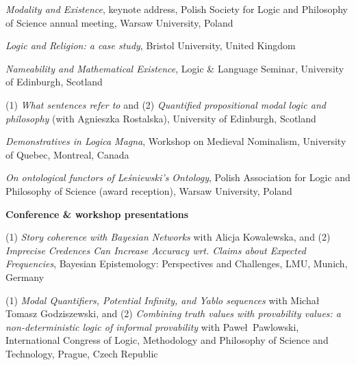 \documentclass[10pt, a4paper]{article}
\newcommand{\years}[1]{\marginnote{\normalsize #1}}
\begin{document}
 \emph{Modality and Existence}, keynote address, Polish Society for Logic and Philosophy of Science annual \newline meeting,  Warsaw University, Poland


\vspace{0.5mm}



 \emph{Logic and Religion: a case study},    Bristol University, United Kingdom



\vspace{0.5mm}


\emph{Nameability and Mathematical Existence},  Logic \& Language Seminar,   University of Edinburgh, Scotland


\vspace{0.5mm}

\years{2008} 
  (1) \emph{What   sentences   refer   to} and (2) 
\emph{Quantified propositional modal  logic and philosophy} (with Agnieszka Rostalska),       University   of    Edinburgh,
Scotland


\vspace{0.5mm}


\years{2006} \emph{Demonstratives in Logica Magna}, Workshop on Medieval Nominalism,  University of Quebec, Montreal, Canada


\vspace{0.5mm}


\pagebreak 
 \years{2005}\emph{On ontological functors of Le{\'s}niewski's Ontology},  Polish Association for Logic and Philosophy of
Science (award reception),  Warsaw University, Poland

\vspace{1.5mm}



 {\sc \textbf{Conference \& workshop presentations}}\normalsize 



\noindent

\vspace{1.5mm}


\years{2020}  (1) \emph{Story coherence with Bayesian Networks} with Alicja Kowalewska, and (2) \emph{ Imprecise Credences Can Increase Accuracy wrt. Claims about Expected Frequencies}, Bayesian Epistemology: Perspectives and Challenges, LMU, Munich, Germany





\years{2019} (1) \emph{Modal Quantifiers, Potential Infinity, and Yablo sequences} with Micha\l\, Tomasz Godziszewski, and (2) \emph{Combining truth values with provability values: a non-deterministic logic of informal provability} with Pawe\l\, Pawlowski, International Congress of Logic, Methodology and Philosophy of Science and Technology, Prague, Czech Republic
\end{document}

